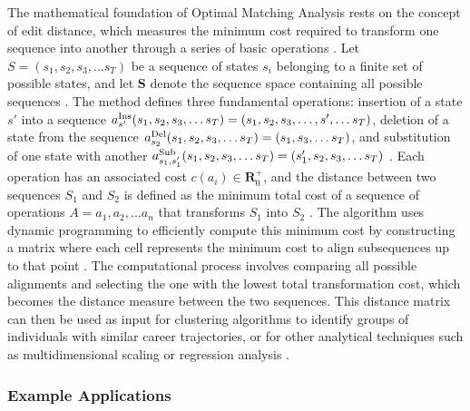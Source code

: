 \documentclass[../main.tex]{subfiles}
\begin{document}
The mathematical foundation of Optimal Matching Analysis rests on the concept of edit distance, which measures the minimum cost required to transform one sequence into another through a series of basic operations \citep{wikipedia_optimal_matching}. Let \(S=(s_{1},s_{2},s_{3},\ldots s_{T})\) be a sequence of states \(s_{i}\) belonging to a finite set of possible states, and let \(\mathbf{S}\) denote the sequence space containing all possible sequences \citep{wikipedia_optimal_matching}. The method defines three fundamental operations: insertion of a state \(s'\) into a sequence \(a_{s'}^{\rm {Ins}}(s_{1},s_{2},s_{3},\ldots s_{T})=(s_{1},s_{2},s_{3},\ldots ,s',\ldots s_{T})\), deletion of a state from the sequence \(a_{s_{2}}^{\rm {Del}}(s_{1},s_{2},s_{3},\ldots s_{T})=(s_{1},s_{3},\ldots s_{T})\), and substitution of one state with another \(a_{s_{1},s'_{1}}^{\rm {Sub}}(s_{1},s_{2},s_{3},\ldots s_{T})=(s'_{1},s_{2},s_{3},\ldots s_{T})\) \citep{wikipedia_optimal_matching}. Each operation has an associated cost \(c(a_{i})\in \mathbf{R}_{0}^{+}\), and the distance between two sequences \(S_{1}\) and \(S_{2}\) is defined as the minimum total cost of a sequence of operations \(A={a_{1},a_{2},\ldots a_{n}}\) that transforms \(S_{1}\) into \(S_{2}\) \citep{wikipedia_optimal_matching}. The algorithm uses dynamic programming to efficiently compute this minimum cost by constructing a matrix where each cell represents the minimum cost to align subsequences up to that point \citep{abbott_forrest_1986}. The computational process involves comparing all possible alignments and selecting the one with the lowest total transformation cost, which becomes the distance measure between the two sequences. This distance matrix can then be used as input for clustering algorithms to identify groups of individuals with similar career trajectories, or for other analytical techniques such as multidimensional scaling or regression analysis \citep{sequence_analysis_wikipedia}.

\subsubsection{Example Applications}
\end{document}
